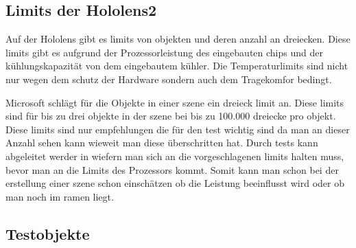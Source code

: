 
\subsection{Limits der Hololens2}\label{subsec:Limits der Hololens2}

Auf der Hololens gibt es limits von objekten und deren anzahl an dreiecken.
Diese limits gibt es aufgrund der Prozessorleistung des eingebauten chips und der kühlungskapazität von dem eingebautem kühler.
Die Temperaturlimits sind nicht nur wegen dem schutz der Hardware sondern auch dem Tragekomfor bedingt. 

Microsoft schlägt für die Objekte in einer szene ein dreieck limit an. Diese limits sind für bis zu drei objekte in der szene bei bis zu 100.000\autocite{optimize_3d} dreiecke pro objekt. 
Diese limits sind nur empfehlungen die für den test wichtig sind da man an dieser Anzahl sehen kann wieweit man diese überschritten hat.
Durch tests kann abgeleitet werder in wiefern man sich an die vorgeschlagenen limits halten muss, bevor man an die Limits des Prozessors kommt.
Somit kann man schon bei der erstellung einer szene schon einschätzen ob die Leistung beeinflusst wird oder ob man noch im ramen liegt.



\newpage
\subsection{Testobjekte}\label{subsec:Testobjekte}


